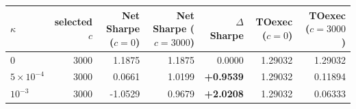 \begin{tabular}{lrrrrrr}
\hline
$\kappa$ & selected $c$ & Net Sharpe ($c=0$) & Net Sharpe ($c=3000$) & $\Delta$ Sharpe & TOexec ($c=0$) & TOexec ($c=3000$) \\
\hline
$0$ & 3000 & 1.1875 & 1.1875 & 0.0000 & 1.29032 & 1.29032 \\
$5\times10^{-4}$ & 3000 & 0.0661 & 1.0199 & \textbf{+0.9539} & 1.29032 & 0.11894 \\
$10^{-3}$ & 3000 & -1.0529 & 0.9679 & \textbf{+2.0208} & 1.29032 & 0.06333 \\
\hline
\end{tabular}

